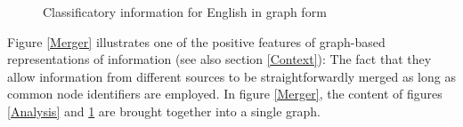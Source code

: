 \documentclass[12pt]{article}
\newcommand{\sref}[1]{section \ref{#1}}
\newcommand{\fref}[1]{figure \ref{#1}}
\begin{document}
\begin{figure}[ht]
\centering
{}
\caption{Classificatory information for English in graph form \label{Genealogy}}
\end{figure}

Figure \ref{Merger} illustrates one of the positive features of graph-based
representations of information (see also \sref{Context}): The fact that they
allow information from different sources to be straightforwardly merged as
long as common node identifiers are employed. In \fref{Merger}, the content
of figures \ref{Analysis} and \ref{Genealogy} are brought together into a single
graph.
\end{document}
